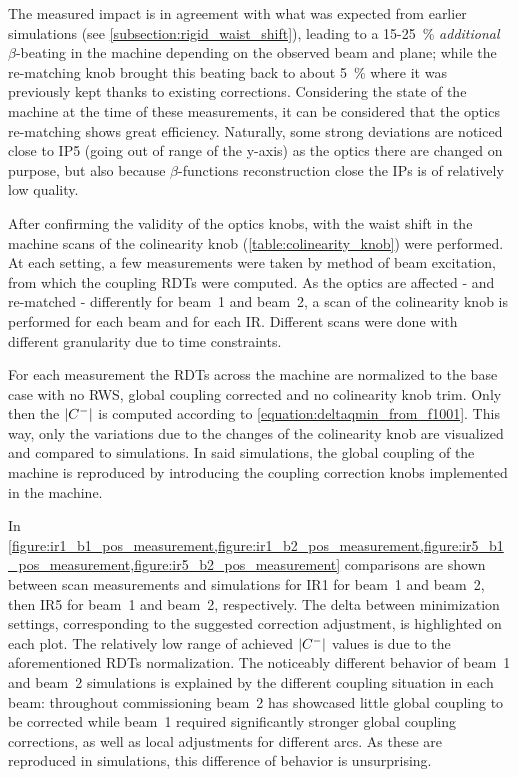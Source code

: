 The measured impact is in agreement with what was expected from earlier simulations (see \cref{subsection:rigid_waist_shift}), leading to a \num{15}-\qty{25}{\percent} \textit{additional} \(\beta\)-beating in the machine depending on the observed beam and plane; while the re-matching knob brought this beating back to about \qty{5}{\percent} where it was previously kept thanks to existing corrections.
Considering the state of the machine at the time of these measurements, it can be considered that the optics re-matching shows great efficiency.
Naturally, some strong deviations are noticed close to IP\num{5} (going out of range of the y-axis) as the optics there are changed on purpose, but also because \(\beta\)-functions reconstruction close the IPs is of relatively low quality.

After confirming the validity of the optics knobs, with the waist shift in the machine scans of the colinearity knob (\cref{table:colinearity_knob}) were performed.
At each setting, a few measurements were taken by method of beam excitation, from which the coupling RDTs were computed.
As the optics are affected - and re-matched - differently for beam~\num{1} and beam~\num{2}, a scan of the colinearity knob is performed for each beam and for each IR.
Different scans were done with different granularity due to time constraints.

For each measurement the RDTs across the machine are normalized to the base case with no RWS, global coupling corrected and no colinearity knob trim.
Only then the \(\left\lvert C^{-} \right\rvert\) is computed according to \cref{equation:deltaqmin_from_f1001}.
This way, only the variations due to the changes of the colinearity knob are visualized and compared to simulations.
In said simulations, the global coupling of the machine is reproduced by introducing the coupling correction knobs implemented in the machine.
\newline

In \cref{figure:ir1_b1_pos_measurement,figure:ir1_b2_pos_measurement,figure:ir5_b1_pos_measurement,figure:ir5_b2_pos_measurement} comparisons are shown between scan measurements and simulations for IR\num{1} for beam~\num{1} and beam~\num{2}, then IR\num{5} for beam~\num{1} and beam~\num{2}, respectively.
The delta between minimization settings, corresponding to the suggested correction adjustment, is highlighted on each plot.
The relatively low range of achieved \(\left\lvert C^{-} \right\rvert\) values is due to the aforementioned RDTs normalization.
The noticeably different behavior of beam~\num{1} and beam~\num{2} simulations is explained by the different coupling situation in each beam: throughout commissioning beam~\num{2} has showcased little global coupling to be corrected while beam~\num{1} required significantly stronger global coupling corrections, as well as local adjustments for different arcs.
As these are reproduced in simulations, this difference of behavior is unsurprising.

